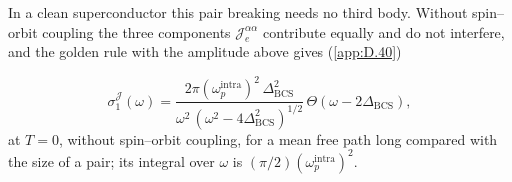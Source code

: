 In a clean superconductor this pair breaking needs no third body. Without spin--orbit coupling the three components $\mathcal{J}^{\alpha\alpha}_e$ contribute equally and do not interfere, and the golden rule with the amplitude above gives (\cref{app:D.40})
\begin{keyresult}
\begin{equation}
  \sigma_1^{\mathcal{J}}(\omega) = \frac{2\pi(\omega_p^{\mathrm{intra}})^2\,\Delta_{\mathrm{BCS}}^2}{\omega^2\,(\omega^2 - 4\Delta_{\mathrm{BCS}}^2)^{1/2}}\,\Theta(\omega - 2\Delta_{\mathrm{BCS}}) ,
  \label{eq:15.4-sJ}
\end{equation}
at $T = 0$, without spin--orbit coupling, for a mean free path long compared with the size of a pair; its integral over $\omega$ is $(\pi/2)(\omega_p^{\mathrm{intra}})^2$.
\end{keyresult}
